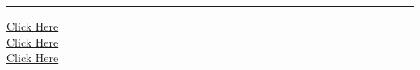 \documentclass[11pt,a4paper]{article}
\begin{document}
\vfill
\rule{\linewidth}{0.4pt}

\begin{center}\small
\href{https://bhu-exam.vercel.app/}{Click Here}\\[4pt]\href{https://me-aryan.vercel.app/}{Click Here}\\[4pt]\href{https://quashan-me.vercel.app/}{Click Here}
\end{center}
\end{document}
